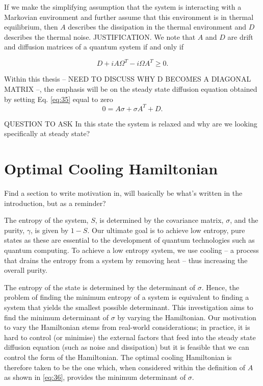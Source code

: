 \documentclass[11pt,a4paper]{article}
\numberwithin{equation}{section}
\begin{document}
	If we make the simplifying assumption that the system is interacting with a Markovian environment and further assume that this environment is in thermal equilibrium, then $A$ describes the dissipation in the thermal environment and $D$ describes the thermal noise. JUSTIFICATION. We note that $A$ and $D$ are drift and diffusion matrices of a quantum system if and only if \cite{Serafini17}
	
	\begin{equation} \label{eq:37}
	D + iA \Omega^T - i\Omega A^T \geq 0.
	\end{equation}
		
	Within this thesis -- NEED TO DISCUSS WHY D BECOMES A DIAGONAL MATRIX --, the emphasis will be on the steady state diffusion equation obtained by setting Eq. \ref{eq:35} equal to zero
	\begin{equation} \label{eq:38}
	0 = A\sigma +\sigma A^{T} + D.
	\end{equation}
	
	\color{blue}QUESTION TO ASK In this state the system is relaxed and why are we looking specifically at steady state? \color{black}
	
	\section{Optimal Cooling Hamiltonian}
	
	Find a section to write motivation in, will basically be what's written in the introduction, but as a reminder?
	
	The entropy of the system, $S$, is determined by the covariance matrix, $\sigma$, and the purity, $\gamma$, is given by $1-S$. Our ultimate goal is to achieve low entropy, pure states as these are essential to the development of quantum technologies such as quantum computing. To achieve a low entropy system, we use cooling -- a process that drains the entropy from a system by removing heat -- thus increasing the overall purity.
	
	The entropy of the state is determined by the determinant of $\sigma$. Hence, the problem of finding the minimum entropy of a system is equivalent to finding a system that yields the smallest possible determinant. This investigation aims to find the minimum determinant of $\sigma$ by varying the Hamiltonian. Our motivation to vary the Hamiltonian stems from real-world considerations; in practice, it is hard to control (or minimise) the external factors that feed into the steady state diffusion equation (such as noise and dissipation) but it is feasible that we can control the form of the Hamiltonian. The optimal cooling Hamiltonian is therefore taken to be the one which, when considered within the definition of $A$ as shown in \ref{eq:36}, provides the minimum determinant of $\sigma$. 
	
\end{document}
